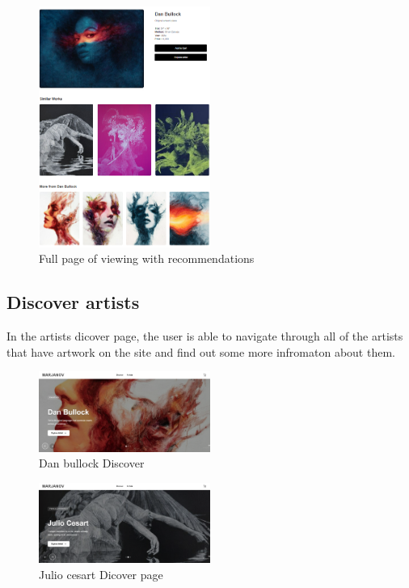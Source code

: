 \documentclass[]{project_final}
\begin{document}
\begin{figure}[ht!]
    \centering
    \includegraphics[width=0.5\textwidth]{AG7.png}
    \vspace*{0.0cm}
    \caption{Full page of viewing with recommendations}
    \label{fig:1}
\end{figure}

\subsection{Discover artists}
In the artists dicover page, the user is able to navigate through all of the artists that have artwork on the site and find out some more infromaton about them.

\begin{figure}[ht!]
    \centering
    \includegraphics[width=0.5\textwidth]{AG8.png}
    \vspace*{0.0cm}
    \caption{Dan bullock Discover}
    \label{fig:1}
\end{figure}

\begin{figure}[ht!]
    \centering
    \includegraphics[width=0.5\textwidth]{AG9.png}
    \vspace*{0.0cm}
    \caption{Julio cesart Dicover page}
    \label{fig:1}
\end{figure}
\end{document}
